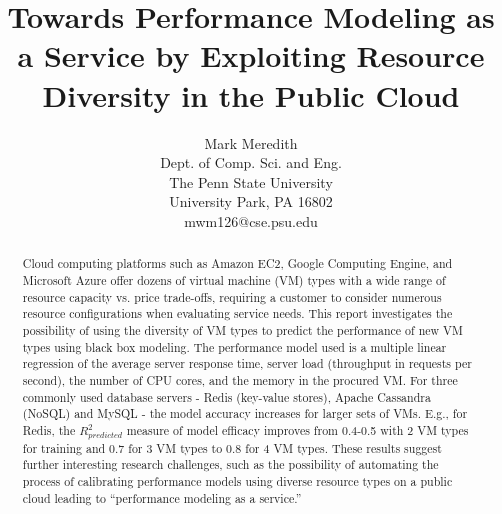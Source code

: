 \documentclass[a4paper,11pt]{article}
\begin{document}
\title{Towards Performance Modeling as a Service by Exploiting Resource Diversity in the Public Cloud}

\author{
Mark Meredith\\
       Dept. of Comp. Sci. and Eng.\\
       The Penn State University\\
       University Park, PA 16802\\
       mwm126@cse.psu.edu
}
\maketitle

\begin{abstract}

Cloud computing platforms such as Amazon EC2, Google Computing Engine, and Microsoft Azure
offer dozens of virtual machine (VM) types with a wide range of resource capacity vs. price trade-offs, requiring a customer to consider numerous resource configurations when evaluating service needs. This report investigates the possibility of using the diversity of VM types to predict the performance of new VM types using black box modeling. The performance model used is a multiple linear regression of the average server response time, server load (throughput in requests per second), the number of CPU cores, and the memory in the procured VM. For three commonly used database servers - Redis (key-value stores), Apache Cassandra (NoSQL) and MySQL -  the model accuracy increases for larger sets of VMs.  E.g., for Redis, the $R^2_{predicted}$ measure of model efficacy improves from 0.4-0.5 with 2 VM types for training and 0.7 for 3 VM types to 0.8 for 4 VM types.  These results suggest further interesting research challenges, such as the possibility of automating the process of calibrating performance models using diverse resource types on a public cloud leading to ``performance modeling as a service.''

\end{abstract}
\end{document}
